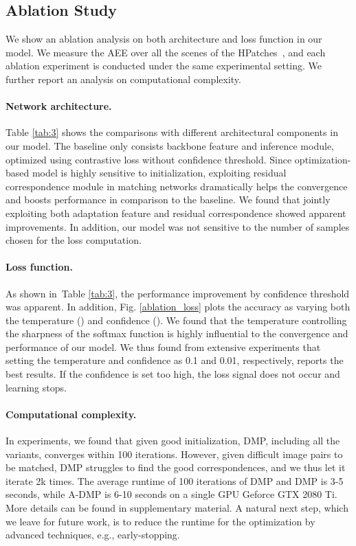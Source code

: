 \documentclass[10pt,twocolumn,letterpaper]{article}
\newcommand{\figref}[1]{Fig. \ref{#1}}
\newcommand{\tabref}[1]{Table \ref{#1}}
\begin{document}
\subsection{Ablation Study}\label{sec:4_5}
We show an ablation analysis on both architecture and loss function in our model. We measure the AEE over all the scenes of the HPatches~\cite{balntas2017hpatches}, and each ablation experiment is conducted under the same experimental setting. We further report an analysis on computational complexity. 
\vspace{-10pt}

\paragraph{Network architecture.}
\tabref{tab:3} shows the comparisons with different architectural components in our model. The baseline only consists backbone feature and inference module, optimized using contrastive loss without confidence threshold. Since optimization-based model is highly sensitive to initialization, exploiting residual correspondence module in matching networks dramatically helps the convergence and boosts performance in comparison to the baseline. We found that jointly exploiting both adaptation feature and residual correspondence showed apparent improvements. In addition, our model was not sensitive to the number of samples chosen for the loss computation. 
\vspace{-10pt}

\paragraph{Loss function.}
As shown in~\tabref{tab:3}, the performance improvement by confidence threshold was apparent. In addition, \figref{ablation_loss} plots the accuracy as varying both the temperature () and confidence (). We found that the temperature controlling the sharpness of the softmax function is highly influential to the convergence and performance of our model. We thus found from extensive experiments that setting the temperature and confidence as 0.1 and 0.01, respectively, reports the best results. If the confidence is set too high, the loss signal does not occur and learning stops.  
\vspace{-10pt}

\paragraph{Computational complexity.}
In experiments, we found that given good initialization, DMP, including all the variants, converges within 100 iterations. 
However, given difficult image pairs to be matched, DMP struggles to find the good correspondences, and we thus let it iterate 2k times. The average runtime of 100 iterations of DMP and DMP is 3-5 seconds, while A-DMP is 6-10 seconds on a single GPU Geforce GTX 2080 Ti. More details can be found in supplementary material. A natural next step, which we leave for future work, is to reduce the runtime for the optimization by advanced techniques, e.g., early-stopping. 
\end{document}
